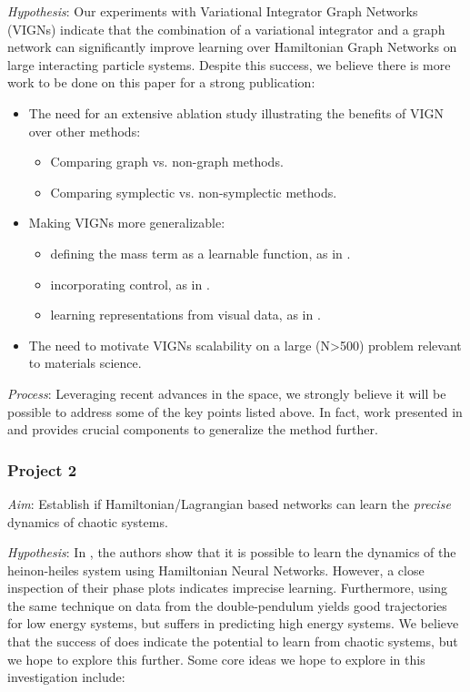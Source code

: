 \documentclass{article}
\begin{document}
\textit{Hypothesis}: Our experiments with Variational Integrator Graph Networks (VIGNs) indicate that the combination of a variational integrator and a graph network can significantly improve learning over Hamiltonian Graph Networks \cite{sanchez-gonzalez_hamiltonian_2019} on large interacting particle systems. Despite this success, we believe there is more work to be done on this paper for a strong publication:

\begin{itemize}
\item{The need for an extensive ablation study illustrating the benefits of VIGN over other methods:}
\begin{itemize}
\item{Comparing graph vs. non-graph methods.}
\item{Comparing symplectic vs. non-symplectic methods.}
\end{itemize}
\item{Making VIGNs more generalizable}:
\begin{itemize}
\item{defining the mass term as a learnable function, as in \cite{lutter_deep_2019}.}
\item{incorporating control, as in \cite{zhong_symplectic_2019}.}
\item{learning representations from visual data, as in \cite{greydanus_hamiltonian_2019}.}
\end{itemize}
\item{The need to motivate VIGNs scalability on a large (N>500) problem relevant to materials science.}
\end{itemize}

\textit{Process}: Leveraging recent advances in the space, we strongly believe it will be possible to address some of the key points listed above. In fact, work presented in \cite{zhong_symplectic_2019} and \cite{lutter_deep_2019} provides crucial components to generalize the method further. 

\subsubsection*{Project 2}

\textit{Aim}: Establish if Hamiltonian/Lagrangian based networks can learn the \textit{precise} dynamics of chaotic systems.

\textit{Hypothesis}: In \cite{choudhary_physics_2019}, the authors show that it is possible to learn the dynamics of the heinon-heiles system using Hamiltonian Neural Networks. However, a close inspection of their phase plots indicates imprecise learning. Furthermore, using the same technique on data from the double-pendulum yields good trajectories for low energy systems, but suffers in predicting high energy systems. We believe that the success of \cite{choudhary_physics_2019} does indicate the potential to learn from chaotic systems, but we hope to explore this further. Some core ideas we hope to explore in this investigation include:
\end{document}
